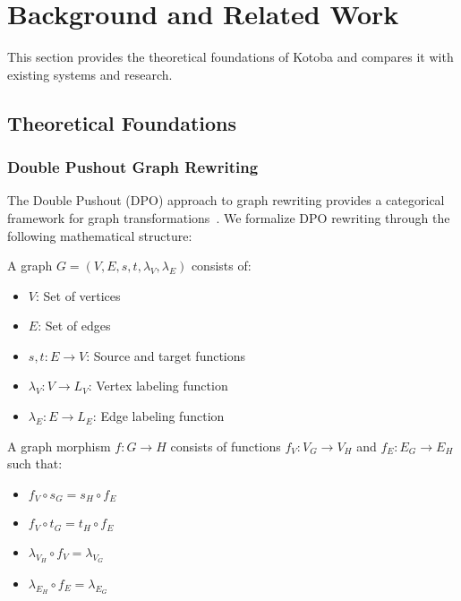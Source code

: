 \documentclass[11pt,a4paper]{article}
\begin{document}
\section{Background and Related Work}
\label{sec:background}

This section provides the theoretical foundations of Kotoba and compares it with existing systems and research.

\subsection{Theoretical Foundations}
\label{subsec:theory}

\subsubsection{Double Pushout Graph Rewriting}
\label{subsubsec:dpo}

The Double Pushout (DPO) approach to graph rewriting provides a categorical framework for graph transformations~\cite{ehrig1973}. We formalize DPO rewriting through the following mathematical structure:

\begin{definition}[Graph]
A graph $G = (V, E, s, t, \lambda_V, \lambda_E)$ consists of:
\begin{itemize}
\item $V$: Set of vertices
\item $E$: Set of edges
\item $s, t: E \rightarrow V$: Source and target functions
\item $\lambda_V: V \rightarrow L_V$: Vertex labeling function
\item $\lambda_E: E \rightarrow L_E$: Edge labeling function
\end{itemize}
\end{definition}

\begin{definition}
A graph morphism $f: G \rightarrow H$ consists of functions $f_V: V_G \rightarrow V_H$ and $f_E: E_G \rightarrow E_H$ such that:
\begin{itemize}
\item $f_V \circ s_G = s_H \circ f_E$
\item $f_V \circ t_G = t_H \circ f_E$
\item $\lambda_{V_H} \circ f_V = \lambda_{V_G}$
\item $\lambda_{E_H} \circ f_E = \lambda_{E_G}$
\end{itemize}
\end{definition}
\end{document}
